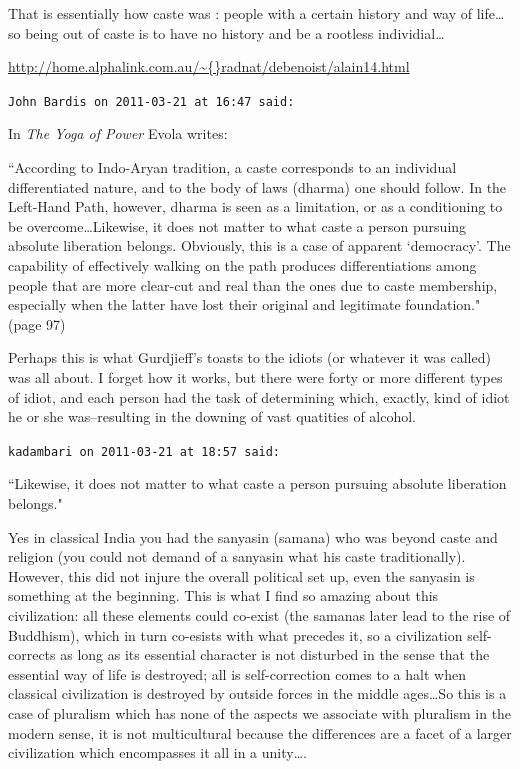 \begin{footnotesize}
\begin{sffamily}
That is essentially how caste was : people with a certain history and way of life…so being out of caste is to have no history and be a rootless individial…

\url{http://home.alphalink.com.au/\~{}radnat/debenoist/alain14.html}


\hfill

\texttt{John Bardis on 2011-03-21 at 16:47 said: }

In \textit{The Yoga of Power} Evola writes:

``According to Indo-Aryan tradition, a caste corresponds to an individual differentiated nature, and to the body of laws (dharma) one should follow. In the Left-Hand Path, however, dharma is seen as a limitation, or as a conditioning to be overcome…Likewise, it does not matter to what caste a person pursuing absolute liberation belongs. Obviously, this is a case of apparent `democracy'. The capability of effectively walking on the path produces differentiations among people that are more clear-cut and real than the ones due to caste membership, especially when the latter have lost their original and legitimate foundation." (page 97)

Perhaps this is what Gurdjieff's toasts to the idiots (or whatever it was called) was all about. I forget how it works, but there were forty or more different types of idiot, and each person had the task of determining which, exactly, kind of idiot he or she was–resulting in the downing of vast quatities of alcohol.


\hfill

\texttt{kadambari on 2011-03-21 at 18:57 said: }

``Likewise, it does not matter to what caste a person pursuing absolute liberation belongs."

Yes in classical India you had the sanyasin (samana) who was beyond caste and religion (you could not demand of a sanyasin what his caste traditionally). However, this did not injure the overall political set up, even the sanyasin is something at the beginning. This is what I find so amazing about this civilization: all these elements could co-exist (the samanas later lead to the rise of Buddhism), which in turn co-esists with what precedes it, so a civilization self-corrects as long as its essential character is not disturbed in the sense that the essential way of life is destroyed; all is self-correction comes to a halt when classical civilization is destroyed by outside forces in the middle ages…So this is a case of pluralism which has none of the aspects we associate with pluralism in the modern sense, it is not multicultural because the differences are a facet of a larger civilization which encompasses it all in a unity….



\end{sffamily}
\end{footnotesize}
